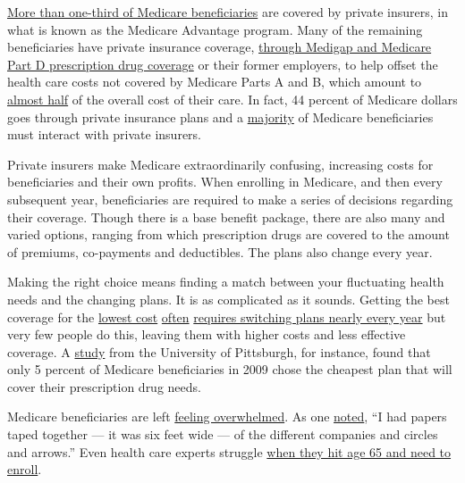 \href{https://www.kff.org/medicare/issue-brief/a-dozen-facts-about-medicare-advantage/}{More
than one-third of Medicare beneficiaries} are covered by private
insurers, in what is known as the Medicare Advantage program. Many of
the remaining beneficiaries have private insurance coverage,
\href{https://www.kff.org/medicare/issue-brief/an-overview-of-medicare/}{through
Medigap and Medicare Part D prescription drug coverage} or their former
employers, to help offset the health care costs not covered by Medicare
Parts A and B, which amount to
\href{https://onlinelibrary.wiley.com/doi/full/10.1111/j.1475-5890.2016.12106}{almost
half} of the overall cost of their care. In fact, 44 percent of Medicare
dollars goes through private insurance plans and a
\href{https://www.kff.org/medicare/issue-brief/an-overview-of-medicare/}{majority}
of Medicare beneficiaries must interact with private insurers.

Private insurers make Medicare extraordinarily confusing, increasing
costs for beneficiaries and their own profits. When enrolling in
Medicare, and then every subsequent year, beneficiaries are required to
make a series of decisions regarding their coverage. Though there is a
base benefit package, there are also many and varied options, ranging
from which prescription drugs are covered to the amount of premiums,
co-payments and deductibles. The plans also change every year.

Making the right choice means finding a match between your fluctuating
health needs and the changing plans. It is as complicated as it sounds.
Getting the best coverage for the
\href{https://www.healthaffairs.org/doi/full/10.1377/hlthaff.2012.0087}{lowest
cost}
\href{https://www.healthaffairs.org/doi/full/10.1377/hlthaff.2012.0087}{often}
\href{https://www.healthaffairs.org/doi/full/10.1377/hlthaff.2012.0087}{requires
switching plans nearly every year} but very few people do this, leaving
them with higher costs and less effective coverage. A
\href{https://www.healthaffairs.org/doi/full/10.1377/hlthaff.2012.0087}{study}
from the University of Pittsburgh, for instance, found that only 5
percent of Medicare beneficiaries in 2009 chose the cheapest plan that
will cover their prescription drug needs.

Medicare beneficiaries are left
\href{https://www.healthaffairs.org/doi/full/10.1377/hlthaff.2011.0132}{feeling
overwhelmed}. As one
\href{https://www.kff.org/report-section/how-are-seniors-choosing-and-changing-health-insurance-plans-what-factors-lead-beneficiaries-to-not-be-enrolled-in-the-lowest-cost-health-plan/}{noted},
``I had papers taped together --- it was six feet wide --- of the
different companies and circles and arrows.'' Even health care experts
struggle
\href{https://www.healthnewsreview.org/2018/11/making-medicare-choices-in-a-marketplace-mess/}{when
they hit age 65 and need to enroll}.

